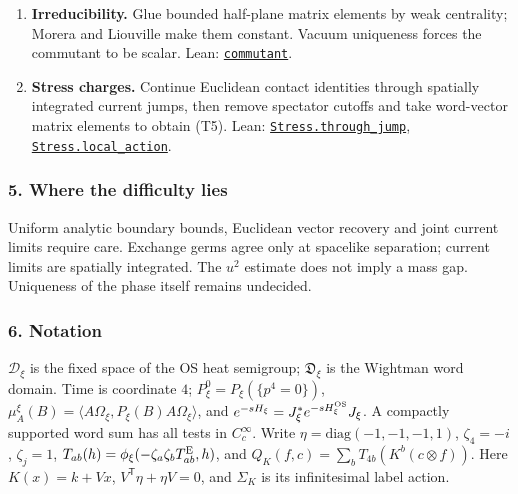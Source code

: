 \documentclass[
  letterpaper,
  11pt]{article}
\begin{document}
\begin{enumerate}
  Almost-everywhere uniqueness and full support extend vacuum-subtracted
  decay everywhere; strong heat limits and density give V.3.2. Lean:
  \href{https://github.com/yang-mills-group/OpenAI-YM-20261028/blob/3456e5e75cf8d4cd558955a5c7638fba2d68f464/YM/EveryPhase/Vacuum.lean\#L51-L78}{\texttt{extends\_decay}},
  \href{https://github.com/yang-mills-group/OpenAI-YM-20261028/blob/3456e5e75cf8d4cd558955a5c7638fba2d68f464/YM/EveryPhase/Vacuum.lean\#L115-L144}{\texttt{all\_plant}}.
\item
  \textbf{Irreducibility.} Glue bounded half-plane matrix elements by
  weak centrality; Morera and Liouville make them constant. Vacuum
  uniqueness forces the commutant to be scalar. Lean:
  \href{https://github.com/yang-mills-group/OpenAI-YM-20261028/blob/3456e5e75cf8d4cd558955a5c7638fba2d68f464/YM/EveryPhase/Irreducible.lean\#L118-L193}{\texttt{commutant}}.
\item
  \textbf{Stress charges.} Continue Euclidean contact identities through
  spatially integrated current jumps, then remove spectator cutoffs and
  take word-vector matrix elements to obtain (T5). Lean:
  \href{https://github.com/yang-mills-group/OpenAI-YM-20261028/blob/3456e5e75cf8d4cd558955a5c7638fba2d68f464/YM/EveryPhase/Through.lean\#L129-L142}{\texttt{Stress.through\_jump}},
  \href{https://github.com/yang-mills-group/OpenAI-YM-20261028/blob/3456e5e75cf8d4cd558955a5c7638fba2d68f464/YM/EveryPhase/Charge.lean\#L143-L177}{\texttt{Stress.local\_action}}.
\end{enumerate}

\subsubsection{5. Where the difficulty
lies}\label{where-the-difficulty-lies-22}

Uniform analytic boundary bounds, Euclidean vector recovery and joint
current limits require care. Exchange germs agree only at spacelike
separation; current limits are spatially integrated. The \(u^2\)
estimate does not imply a mass gap. Uniqueness of the phase itself
remains undecided.

\subsubsection{6. Notation}\label{notation-22}

\(\mathcal D_\xi\) is the fixed space of the OS heat semigroup;
\(\mathfrak D_\xi\) is the Wightman word domain. Time is coordinate
\(4\); \(P^0_\xi=P_\xi(\{p^4=0\})\),
\(\mu_A^\xi(B)=\langle A\Omega_\xi,P_\xi(B)A\Omega_\xi\rangle\), and
\(e^{-sH_\xi}=J_\xi^*e^{-sH^{\rm OS}_\xi}J_\xi\). A compactly supported
word sum has all tests in \(C_c^\infty\). Write
\(\eta=\mathrm{diag}(-1,-1,-1,1)\), \(\zeta_4=-i\), \(\zeta_j=1\),
\(T_{ab}(h)=\phi_\xi(-\zeta_a\zeta_bT^{\rm E}_{ab},h)\), and
\(Q_K(f,c)=\sum_bT_{4b}(K^b(c\otimes f))\). Here \(K(x)=k+Vx\),
\(V^{\mathsf T}\eta+\eta V=0\), and \(\Sigma_K\) is its infinitesimal
label action.
\end{document}
